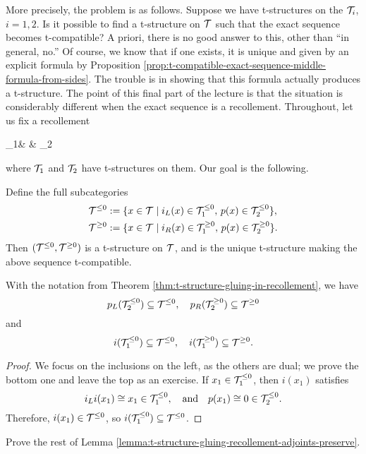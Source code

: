 More precisely, the problem is as follows. Suppose we have t-structures on the \(\mathcal{T}_i\), \(i=1,2\). Is it possible to find a t-structure on \(\mathcal{T}\) such that the exact sequence
becomes t-compatible? A priori, there is no good answer to this, other than ``in general, no.'' Of course, we know that if one exists, it is unique and given by an explicit formula by
Proposition \ref{prop:t-compatible-exact-sequence-middle-formula-from-sides}. The trouble is in showing that this formula actually produces a t-structure.
The point of this final part of the lecture is that the situation is considerably different when the exact sequence is a recollement.
Throughout, let us fix a recollement
\begin{diagram*}[column sep=large]
	\calT_1\ar[r,"i" description,""{below,name=A},""{above,name=AA}] &
		\calT \ar[r,"p" description,""{below,name=C},""{above,name=CC}]\ar[l,bend left,shift left,"i_R",""{above,name=B}]\ar[l,bend right,shift right,"i_L"',""{below,name=BB}] &
		\calT_2 \ar[l,bend left,shift left,"p_R",""{above,name=D}]\ar[l,bend right,shift right,"p_L"',""{below,name=DD}]
		\ar[from=B,to=A,symbol=\vdash]\ar[from=D,to=C,symbol=\vdash]
		\ar[from=AA,to=BB,symbol=\vdash]\ar[from=CC,to=DD,symbol=\vdash]
\end{diagram*}
where \(\mathcal{T}_1\) and \(\mathcal{T}_2\) have t-structures on them. Our goal is the following.
\begin{theorem}\label{thm:t-structure-gluing-in-recollement}
	Define the full subcategories
	\begin{align*}
		\mathcal{T}^{\leq 0} &:= \{ x \in \mathcal{T} \mid i_L(x) \in \mathcal{T}_1^{\leq 0},\, p(x)\in\mathcal{T}_2^{\leq 0} \}, \\
		\mathcal{T}^{\geq 0} &:= \{ x \in \mathcal{T} \mid i_R(x) \in \mathcal{T}_1^{\geq 0},\, p(x)\in\mathcal{T}_2^{\geq 0} \}.
	\end{align*}
	Then \((\mathcal{T}^{\leq 0},\mathcal{T}^{\geq 0})\) is a t-structure on \(\mathcal{T}\), and is the unique t-structure making the above sequence t-compatible.
\end{theorem}


\begin{lemma}\label{lemma:t-structure-gluing-recollement-adjoints-preserve}
	With the notation from Theorem \ref{thm:t-structure-gluing-in-recollement}, we have
	\[ p_L(\mathcal{T}_2^{\leq 0}) \subseteq \mathcal{T}^{\leq 0},\quad p_R(\mathcal{T}_2^{\geq 0}) \subseteq \mathcal{T}^{\geq 0} \]
	and
	\[ i(\mathcal{T}_1^{\leq 0})\subseteq \mathcal{T}^{\leq 0},\quad i(\mathcal{T}_1^{\geq 0})\subseteq\mathcal{T}^{\geq 0}. \]
\end{lemma}
\begin{proof}
We focus on the inclusions on the left, as the others are dual; we prove the bottom one and leave the top as an exercise. If \(x_1\in\mathcal{T}_1^{\leq 0}\),
then \(i(x_1)\) satisfies
\[ i_Li(x_1) \cong x_1 \in \mathcal{T}_1^{\leq 0},\quad \text{and} \quad p(x_1) \cong 0 \in\mathcal{T}_2^{\leq 0}. \]
Therefore, \(i(x_1)\in\mathcal{T}^{\leq 0}\), so \(i(\mathcal{T}_1^{\leq 0})\subseteq\mathcal{T}^{\leq 0}\).
\end{proof}
\begin{exercise}
	Prove the rest of Lemma \ref{lemma:t-structure-gluing-recollement-adjoints-preserve}.
\end{exercise}

